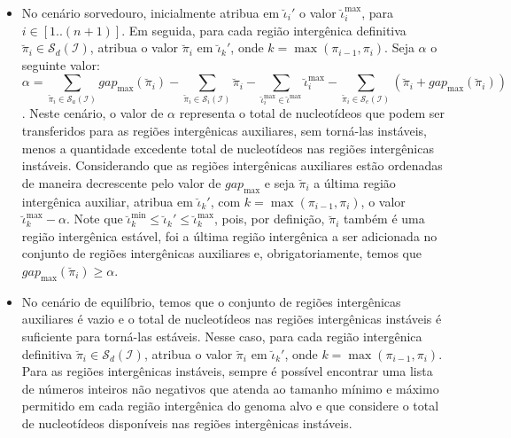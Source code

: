 \begin{itemize}
\begin{itemize}
    \item No cenário sorvedouro, inicialmente atribua em $\breve\iota_{i}'$ o valor $\breve\iota^{\max}_i$, para $i \in [1..({n+1})]$. Em seguida, para cada região intergênica definitiva $\breve\pi_i \in \mathcal{S}_{d}(\mathcal{I})$, atribua o valor $\breve\pi_i$ em $\breve\iota_{k}'$, onde $k = \max(\pi_{i-1},\pi_i)$. Seja $\alpha$ o seguinte valor:
  $$\alpha = \sum_{\breve\pi_i \in \mathcal{S}_{a}(\mathcal{I})} gap_{\max}(\breve\pi_i) - \sum_{\breve\pi_i \in \mathcal{S}_{i}(\mathcal{I})} \breve\pi_i - \sum_{\breve\iota_{i}^{\max}  \in \breve\iota^{\max}} \breve\iota_{i}^{\max} - \sum_{\breve\pi_i \in \mathcal{S}_{e}(\mathcal{I})} (\breve\pi_i + gap_{\max}(\breve\pi_i))$$.
    Neste cenário, o valor de $\alpha$ representa o total de nucleotídeos que podem ser transferidos para as regiões intergênicas auxiliares, sem torná-las instáveis, menos a quantidade excedente total de nucleotídeos nas regiões intergênicas instáveis. Considerando que as regiões intergênicas auxiliares estão ordenadas de maneira decrescente pelo valor de $gap_{\max}$ e seja $\breve\pi_i$ a última região intergênica auxiliar, atribua em $\breve\iota_{k}'$, com $k = \max(\pi_{i-1},\pi_i)$, o valor $\breve\iota^{\max}_k - \alpha$. Note que $\breve\iota^{\min}_k \le \breve\iota_{k}' \le \breve\iota^{\max}_k$, pois, por definição, $\breve\pi_i$ também é uma região intergênica estável, foi a última região intergênica a ser adicionada no conjunto de regiões intergênicas auxiliares e, obrigatoriamente, temos que $gap_{\max}(\breve\pi_i) \ge \alpha$.

    \item No cenário de equilíbrio, temos que o conjunto de regiões intergênicas auxiliares é vazio e o total de nucleotídeos nas regiões intergênicas instáveis é suficiente para torná-las estáveis. Nesse caso, para cada região intergênica definitiva $\breve\pi_i \in \mathcal{S}_{d}(\mathcal{I})$, atribua o valor $\breve\pi_i$ em $\breve\iota_{k}'$, onde $k = \max(\pi_{i-1},\pi_i)$. Para as regiões intergênicas instáveis, sempre é possível encontrar uma lista de números inteiros não negativos que atenda ao tamanho mínimo e máximo permitido em cada região intergênica do genoma alvo e que considere o total de nucleotídeos disponíveis nas regiões intergênicas instáveis.
  \end{itemize}
\end{itemize}

